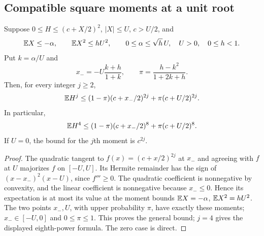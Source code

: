 \subsection{Compatible square moments at a unit root}
\label{sec:unit-square-payments}

\begin{lemma}
\label{lem:unit-square-hermite}
Suppose $0\le H\le(c+X/2)^2$, $|X|\le U$, $c>U/2$, and
\[
 \mathbb E X\le-\alpha,\qquad \mathbb E X^2\le hU^2,\qquad
 0\le\alpha\le\sqrt h\,U,\quad U>0,\quad0\le h<1.
\]
Put $k=\alpha/U$ and
\[
 x_-=-U\frac{k+h}{1+k},\qquad
 \pi=\frac{h-k^2}{1+2k+h}.
\]
Then, for every integer $j\ge2$,
\begin{equation}\label{eq:unit-square-hermite:general}
 \mathbb E H^j\le
 (1-\pi)(c+x_-/2)^{2j}+\pi(c+U/2)^{2j}.
\end{equation}
In particular,
\begin{equation}\label{eq:unit-square-hermite}
 \mathbb E H^4\le
 (1-\pi)(c+x_-/2)^8+\pi(c+U/2)^8.
\end{equation}
If $U=0$, the bound for the $j$th moment is $c^{2j}$.
\end{lemma}
\begin{proof}
The quadratic tangent to $f(x)=(c+x/2)^{2j}$ at $x_-$ and agreeing
with $f$ at $U$ majorizes $f$ on $[-U,U]$. Its Hermite remainder
has the sign of $(x-x_-)^2(x-U)$, since $f'''\ge0$.
The quadratic coefficient is nonnegative by convexity, and the linear
coefficient is nonnegative because $x_-\le0$.
Hence its expectation is at most its value at the moment bounds
$\mathbb E X=-\alpha$, $\mathbb E X^2=hU^2$.
The two points $x_-,U$, with upper probability $\pi$, have exactly
these moments; $x_-\in[-U,0]$ and $0\le\pi\le1$.
This proves the general bound; $j=4$ gives the displayed eighth-power
formula. The zero case is direct.
\end{proof}

